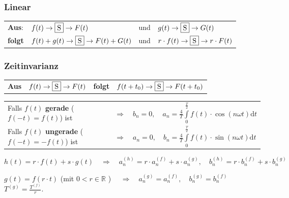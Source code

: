       \subsubsection{Linear}
      \begin{tabular}{llll}
            \textbf{Aus}: &
            $f(t)\to \fbox{S}\to F(t)$ &
            und &
            $g(t)\to \fbox{S}\to G(t)$ \\
            \textbf{folgt} &
            $f(t)+g(t)\to \fbox{S}\to F(t)+G(t)$ &
            und &
            $r\cdot f(t)\to\fbox{S}\to r\cdot F(t)$ \\
        \end{tabular}
        \subsubsection{Zeitinvarianz}
        \begin{tabular}{llll}
            \textbf{Aus} &
            $f(t)\to \fbox{S}\to F(t)$ &
            \textbf{folgt} &
            $f(t+t_0)\to \fbox{S}\to F(t+t_0)$\\
        \end{tabular}
    \begin{tabular}{ll}
        Falls $f(t)$ \textbf{gerade} ($ f(-t)=f(t) $) ist 
        & $\quad \Longrightarrow \quad 
      b_n = 0, \quad a_n = \frac{4}{T} \int\limits_0^{\frac{T}{2}} f(t) \cdot
      \cos(n \omega t) \mathrm{d}t$ \\
      Falls $f(t)$ \textbf{ungerade} ($ f(-t)=-f(t) $) ist
      &$\quad \Longrightarrow \quad a_n = 0, \quad b_n =  \frac{4}{T} 
      \int\limits_0^{\frac{T}{2}} f(t) \cdot \sin(n \omega t) \mathrm{d}t$
        \end{tabular}
       
      $h(t) = r \cdot f(t) + s \cdot g(t) \quad \Longrightarrow \quad a_n^{(h)} = r \cdot
      a_n^{(f)} + s \cdot a_n^{(g)}, \quad b_n^{(h)} = r \cdot b_n^{(f)} + s \cdot b_n^{(g)}$
      
      $g(t) = f(r \cdot t) $ (mit $ 0 < r \in \mathbb{R}$ ) $\quad \Longrightarrow\quad  
      a_n^{(g)} = a_n^{(f)}, \quad b_n^{(g)} = b_n^{(f)} $ \quad $T^{(g)} = \frac{T^{(f)}}{r}$.
      
